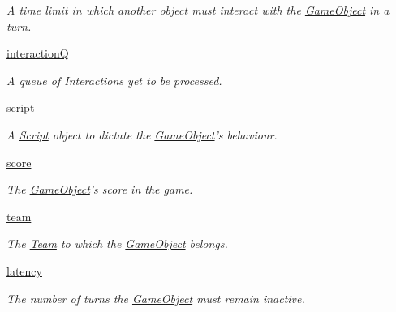 \begin{DoxyCompactItemize}
\begin{DoxyCompactList}\small\item\em \-A time limit in which another object must interact with the \hyperlink{classGameObject_1_1GameObject}{\-Game\-Object} in a turn. \end{DoxyCompactList}\item 
\hypertarget{classGameObject_1_1GameObject_aff791d0b641e0cb3c7cdc866fdfbc11b}{\hyperlink{classGameObject_1_1GameObject_aff791d0b641e0cb3c7cdc866fdfbc11b}{interaction\-Q}}\label{classGameObject_1_1GameObject_aff791d0b641e0cb3c7cdc866fdfbc11b}

\begin{DoxyCompactList}\small\item\em \-A queue of \-Interactions yet to be processed. \end{DoxyCompactList}\item 
\hypertarget{classGameObject_1_1GameObject_ab07b7b2942157b5efd3d4f601e66e6b0}{\hyperlink{classGameObject_1_1GameObject_ab07b7b2942157b5efd3d4f601e66e6b0}{script}}\label{classGameObject_1_1GameObject_ab07b7b2942157b5efd3d4f601e66e6b0}

\begin{DoxyCompactList}\small\item\em \-A \hyperlink{namespaceScript}{\-Script} object to dictate the \hyperlink{classGameObject_1_1GameObject}{\-Game\-Object}'s behaviour. \end{DoxyCompactList}\item 
\hypertarget{classGameObject_1_1GameObject_a8f4b4fba6325dddc09d5397355dc39ba}{\hyperlink{classGameObject_1_1GameObject_a8f4b4fba6325dddc09d5397355dc39ba}{score}}\label{classGameObject_1_1GameObject_a8f4b4fba6325dddc09d5397355dc39ba}

\begin{DoxyCompactList}\small\item\em \-The \hyperlink{classGameObject_1_1GameObject}{\-Game\-Object}'s score in the game. \end{DoxyCompactList}\item 
\hypertarget{classGameObject_1_1GameObject_a6b698ab77c4ec126f9eacae6643a611c}{\hyperlink{classGameObject_1_1GameObject_a6b698ab77c4ec126f9eacae6643a611c}{team}}\label{classGameObject_1_1GameObject_a6b698ab77c4ec126f9eacae6643a611c}

\begin{DoxyCompactList}\small\item\em \-The \hyperlink{namespaceTeam}{\-Team} to which the \hyperlink{classGameObject_1_1GameObject}{\-Game\-Object} belongs. \end{DoxyCompactList}\item 
\hyperlink{classGameObject_1_1GameObject_aa914c6d1be8d6d4276cf9138564865d2}{latency}
\begin{DoxyCompactList}\small\item\em \-The number of turns the \hyperlink{classGameObject_1_1GameObject}{\-Game\-Object} must remain inactive. \end{DoxyCompactList}\end{DoxyCompactItemize}
